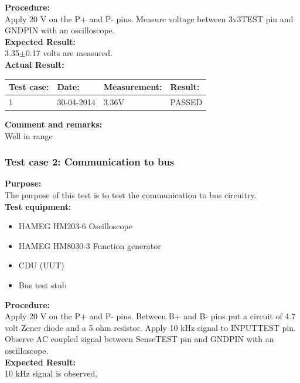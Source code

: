 \textbf{Procedure:}\\
Apply 20 V on the P+ and P- pins. Measure voltage between 3v3TEST pin and GNDPIN with an oscilloscope.\\

\textbf{Expected Result:}\\
3.35$\pm$0.17 volts are measured.\\

\textbf{Actual Result:}\\
\begin{table}[H]
\centering
\begin{tabular}{|p{2cm}|p{2cm}|p{3cm}|p{2cm}|}\hline
\textbf{Test case:} & \textbf{Date:} & \textbf{Measurement:} & \textbf{Result:} \\ \hline
1 & 30-04-2014 & 3.36V & PASSED \\ \hline
\end{tabular}
\end{table}

\textbf{Comment and remarks:}\\
Well in range\\

\subsubsection{Test case 2: Communication to bus}
\textbf{Purpose:}\\
The purpose of this test is to test the communication to bus circuitry.\\

\textbf{Test equipment:}
\begin{itemize}
\item HAMEG HM203-6 Oscilloscope
\item HAMEG HM8030-3 Function generator
\item CDU (UUT)
\item Bus test stub
\end{itemize}

\textbf{Procedure:}\\
Apply 20 V on the P+ and P- pins. Between B+ and B- pins put a circuit of 4.7 volt Zener diode and a 5 ohm resistor. Apply 10 kHz signal to INPUTTEST pin. Observe AC coupled signal between SenseTEST pin and GNDPIN with an oscilloscope.\\

\textbf{Expected Result:}\\
10 kHz signal is observed.\\

